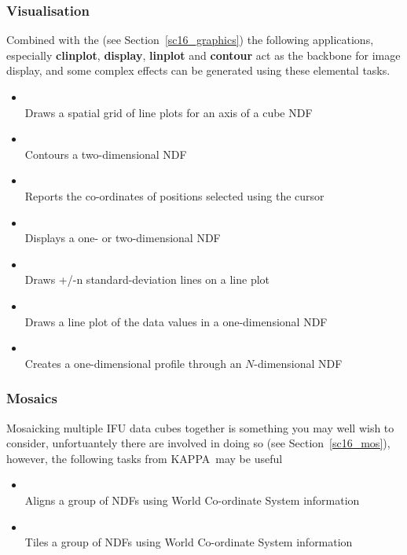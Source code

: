 \documentclass[twoside,11pt]{starlink}
\providecommand{\KAPPA}{{\footnotesize KAPPA}\normalsize}
\begin{document}
\subsubsection{Visualisation}

Combined with the   (see
Section~\ref{sc16_graphics}) the following applications, especially
\textbf{clinplot}, \textbf{display}, \textbf{linplot} and \textbf{contour} act as the backbone
for image display, and some complex effects can be generated using
these elemental tasks.

\begin{itemize}
\item{}\\
Draws a spatial grid of line plots for an axis of a cube NDF
\item{}\\
Contours a two-dimensional NDF
\item{}\\
Reports the co-ordinates of positions selected using the cursor
\item{}\\
Displays a one- or two-dimensional NDF
\item{}\\
Draws +/-n standard-deviation lines on a line plot
\item{}\\
Draws a line plot of the data values in a one-dimensional NDF
\item{}\\
Creates a one-dimensional profile through an $N$-dimensional NDF
\end{itemize}

\subsubsection{Mosaics}

Mosaicking multiple IFU data cubes together is something you may well
wish to consider, unfortuantely there are 
involved in doing so (see Section~\ref{sc16_mos}), however,
the following tasks from \KAPPA\ may be useful

\begin{itemize}
\item{}\\
Aligns a group of NDFs using World Co-ordinate System information
\item{}\\
Tiles a group of NDFs using World Co-ordinate System information
\end{itemize}
\end{document}
